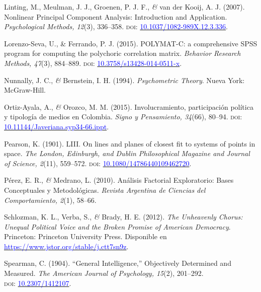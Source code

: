 \documentclass[a4paper]{tufte-handout}
\begin{document}
\begin{list}{}
\item{\small Linting, M., Meulman, J. J., Groenen, P. J. F., {\itshape \&} van der Kooij, A. J. (2007). Nonlinear Principal Component Analysis: Introduction and Application. {\itshape Psychological Methods, 12}(3), 336--358. {\scshape doi:} \href{https://psycnet.apa.org/doi/10.1037/1082-989X.12.3.336}{\textcolor{blue}{10.1037/1082-989X.12.3.336}}.}

\item{\small Lorenzo-Seva, U., \& Ferrando, P. J. (2015). POLYMAT-C: a comprehensive SPSS program for computing the polychoric correlation matrix. {\itshape Behavior Research Methods, 47}(3), 884--889. {\scshape doi:} \href{https://doi.org/10.3758/s13428-014-0511-x}{\textcolor{blue}{10.3758/s13428-014-0511-x}}.}

\item{\small Nunnally, J. C., {\itshape \&} Bernstein, I. H. (1994). {\itshape Psychometric Theory}. Nueva York: McGraw-Hill.}

\item{\small Ortiz-Ayala, A., {\itshape \&} Orozco, M. M. (2015). Involucramiento, participación política y tipología de medios en Colombia. {\itshape Signo y Pensamiento, 34}(66), 80--94. {\scshape doi:} \href{https://doi.org/10.11144/Javeriana.syp34-66.ippt}{\textcolor{blue}{10.11144/Javeriana.syp34-66.ippt}}.}

\item{\small Pearson, K. (1901). LIII. On lines and planes of closest fit to systems of points in space. {\itshape The London, Edinburgh, and Dublin Philosophical Magazine and Journal of Science, 2}(11), 559--572. {\scshape doi:} \href{https://doi.org/10.1080/14786440109462720}{\textcolor{blue}{10.1080/14786440109462720}}.}

\item{\small Pérez, E. R., {\itshape \&} Medrano, L. (2010). Análisis Factorial Exploratorio: Bases Conceptuales y Metodológicas. {\itshape Revista Argentina de Ciencias del Comportamiento, 2}(1), 58--66.}

\item{\small Schlozman, K. L., Verba, S., {\itshape \&} Brady, H. E. (2012). {\itshape The Unheavenly Chorus: Unequal Political Voice and the Broken Promise of American Democracy}. Princeton: Princeton University Press. Disponible en \\ \href{https://www.jstor.org/stable/j.ctt7sn9z}{\textcolor{blue}{https://www.jstor.org/stable/j.ctt7sn9z}}.}

\item{\small Spearman, C. (1904). ``General Intelligence,'' Objectively Determined and Measured. {\itshape The American Journal of Psychology, 15}(2), 201--292. \\ {\scshape doi:} \href{https://doi.org/10.2307/1412107}{\textcolor{blue}{10.2307/1412107}}.}


\end{list}
\end{document}
